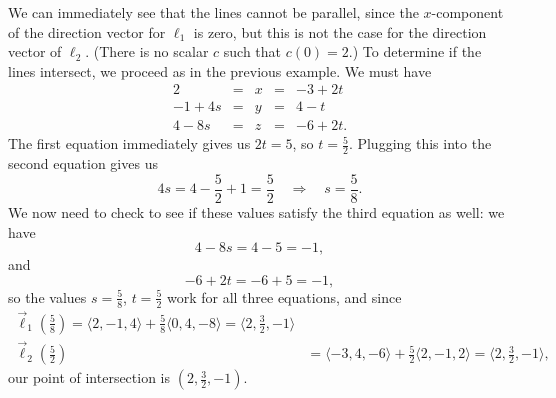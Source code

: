 
{We can immediately see that the lines cannot be parallel, since the $x$-component of the direction vector for $\ell_1$ is zero, but this is not the case for the direction vector of $\ell_2$. (There is no scalar $c$ such that $c(0)=2$.) To determine if the lines intersect, we proceed as in the previous example. We must have
\[
\begin{array}{ccccc}
2 & = & x & = &-3+2t\\
-1+4s & = &  y & = & 4-t\\
4-8s & = & z & = & -6+2t.
\end{array}
\]
The first equation immediately gives us $2t=5$, so $t=\frac{5}{2}$. Plugging this into the second equation gives us
\[
4s = 4-\frac{5}{2}+1 = \frac{5}{2} \quad \Rightarrow \quad s=\frac{5}{8}.
\]
We now need to check to see if these values satisfy the third equation as well: we have
\[
4-8s = 4-5=-1,
\]
and
\[
-6+2t = -6+5=-1,
\]
so the values $s=\frac{5}{8}$, $t=\frac{5}{2}$ work for all three equations, and since
\begin{align*}
\vec\ell_1\left(\frac{5}{8}\right) = \langle 2, -1, 4\rangle +\frac{5}{8}\langle 0, 4, -8\rangle = \langle 2, \frac{3}{2}, -1\rangle \tag*{and}\\
\vec\ell_2\left(\frac{5}{2}\right) & = \langle -3, 4, -6\rangle+\frac{5}{2}\langle 2, -1, 2\rangle = \langle 2, \frac{3}{2}, -1\rangle,
\end{align*}
our point of intersection is $(2, \frac{3}{2}, -1)$.
}\\


